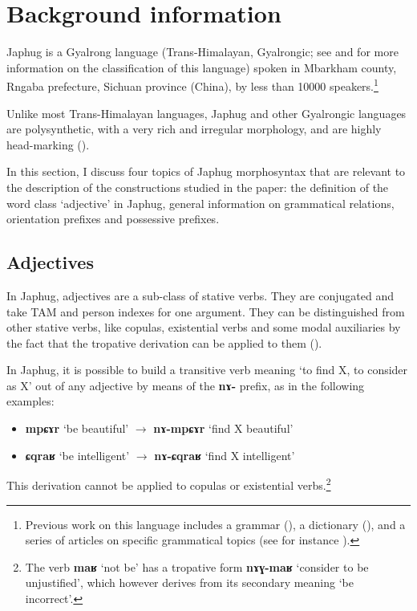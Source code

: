 \documentclass[oneside,a4paper,11pt]{article}
\newcommand{\ipa}[1]{{\phon\textbf{#1}}}
\begin{document}
\section{Background information} \label{sec:background}
Japhug is a Gyalrong language (Trans-Himalayan, Gyalrongic; see \citealt{jackson00sidaba} and \citealt{jacques.michaud11naish} for more information on the classification of this language) spoken in Mbarkham county, Rngaba prefecture, Sichuan province (China), by less than 10000 speakers.\footnote{Previous work on this language includes a grammar (\citealt{jacques08}), a dictionary (\citealt{jacques15japhug}), and a series of articles on specific grammatical topics (see for instance \citealt{jacques13harmonization, jacques14linking, jacques16relatives}). } 


Unlike most Trans-Himalayan languages, Japhug and other Gyalrongic languages are polysynthetic, with a very rich and irregular morphology, and are highly head-marking (\citealt{jacques13harmonization, jackson14morpho}).

In this section, I discuss four topics of Japhug morphosyntax that are relevant to the description of the constructions studied in the paper: the definition of the word class `adjective' in Japhug, general information on grammatical relations, orientation prefixes and possessive prefixes.


\subsection{Adjectives}
In Japhug, adjectives are a sub-class of stative verbs. They are conjugated and take TAM and person indexes for one argument. They can be distinguished from other stative verbs, like copulas, existential verbs and some modal auxiliaries by the fact that the tropative derivation can be applied to them (\citealt{jacques13tropative}).

In Japhug, it is possible to build a transitive verb meaning `to find X, to consider as X' out of any adjective by means of the \ipa{nɤ-} prefix, as in the following examples:

\begin{itemize}
\item \ipa{mpɕɤr} `be beautiful' $\rightarrow$ \ipa{nɤ-mpɕɤr} `find X beautiful'
\item \ipa{ɕqraʁ} `be intelligent' $\rightarrow$ \ipa{nɤ-ɕqraʁ} `find X intelligent'
\end{itemize}

This derivation cannot be applied to copulas or existential verbs.\footnote{The verb \ipa{maʁ} `not be' has a tropative form \ipa{nɤɣ-maʁ} `consider to be unjustified', which however derives from its secondary meaning `be incorrect'.} 
\end{document}
